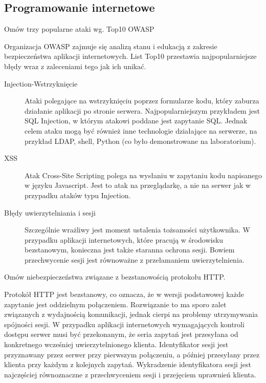 \documentclass[answers,11pt]{exam}
\begin{document}
\subsection{Programowanie internetowe}
\begin{questions}

\question Omów trzy popularne ataki wg. Top10 OWASP
\begin{solution}
Organizacja OWASP zajmuje się analizą stanu i edukacją z zakresie bezpieczeństwa aplikacji internetowych. List Top10 przestawia najpopularniejsze błędy wraz z zaleceniami tego jak ich unikać.
\begin{description}
\item[Injection-Wstrzyknięcie] Ataki polegające na wstrzyknięciu poprzez formularze kodu, który zaburza działanie aplikacji po stronie serwera. Najpopularniejszym przykładem jest SQL Injection, w którym atakowi poddane jest zapytanie SQL. Jednak celem ataku mogą być również inne technologie działające na serwerze, na przykład LDAP, shell, Python (co było demonstrowane na laboratorium).
\item[XSS] Atak Cross-Site Scripting polega na wysłaniu w zapytaniu kodu napisanego w języku Javascript. Jest to atak na przeglądarkę, a nie na serwer jak w przypadku ataków typu Injection.
\item[Błędy uwierzytelniania i sesji] Szczególnie wrażliwy jest moment ustalenia tożsamości użytkownika. W przypadku aplikacji internetowych, które pracują w środowisku bezstanowym, konieczna jest także staranna ochrona sesji. Bowiem przechwycenie sesji jest równoważne z przełamaniem uwierzytelnienia.
\end{description}
\end{solution}

\question Omów niebezpieczeństwa związane z bezstanowością protokołu HTTP.
\begin{solution}
Protokół HTTP jest bezstanowy, co oznacza, że w wersji podstawowej każde zapytanie jest oddzielnym połączeniem. Rozwiązanie to ma sporo zalet związanych z wydajnością komunikacji, jednak cierpi na problemy utrzymywania spójności sesji. W przypadku aplikacji internetowych wymagających kontroli dostępu serwer musi być przekonanym, że seria zapytań jest przesyłana od konkretnego wcześniej uwierzytelnionego klienta. Identyfikator sesji jest przyznawany przez serwer przy pierwszym połączeniu, a później przesyłany przez klienta przy każdym z kolejnych zapytań. Wykradzenie identyfikatora sesji jest najczęściej równoznaczne z przechwyceniem sesji i przejęciem uprawnień klienta. 
\end{solution}


\end{questions}
\end{document}
